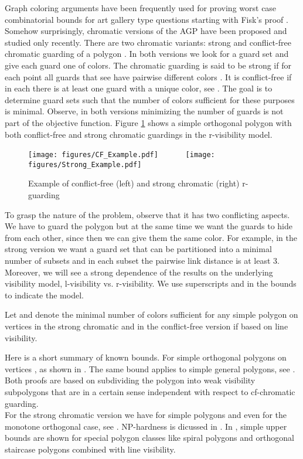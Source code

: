 \documentclass[a4paper,USenglish,numberwithinsect]{lipics}
\theoremstyle{plain}
\begin{document}
Graph  coloring arguments have been frequently
used  for proving worst case combinatorial bounds for art
gallery type questions starting with Fisk's proof \cite{Fisk}. Somehow
surprisingly, chromatic versions of the AGP have been
proposed and studied only recently. There are two chromatic variants: strong
 and conflict-free chromatic guarding  of a polygon . In  both
versions we look for a guard set  and give each guard one of 
colors. The chromatic guarding is said to be strong if for each point
 all guards  that see  have pairwise different colors
\cite{ELV}.  It is conflict-free if in  each   there is at least
one guard with a unique color, see \cite{BS}. The goal is to determine guard
sets such that the   number of colors sufficient  for these purposes is
minimal.  Observe, in both versions minimizing the number of guards is not
part of the objective function.  Figure \ref{cf_st_example} shows a simple orthogonal polygon with
both conflict-free and strong chromatic guardings in the r-visibility model.
\begin{figure}
\centering
\texttt{[image: figures/CF\_Example.pdf]}
\ \ \ \ \ \ \texttt{[image: figures/Strong\_Example.pdf]}

\caption{Example of conflict-free (left) and strong chromatic (right) r-guarding}
\label{cf_st_example}
\end{figure}
To grasp the nature of the problem, observe that it has two conflicting aspects. 
We have to guard the polygon but at the same time we want the guards to hide from each other, 
since then we can give them the same color. For example, in the strong version we want a guard set 
that can be partitioned into a minimal number of subsets and in each subset the pairwise link distance is at least 3.
Moreover, we will see a strong dependence of the results on the underlying visibility model, l-visibility vs. r-visibility. We use superscripts
 and  in the bounds to indicate the model.

Let  and   denote the minimal number of colors sufficient for any simple polygon on  vertices in the strong chromatic and in the conflict-free version if based on line visibility.

Here is a short summary of known bounds. For simple orthogonal polygons on  vertices
, as shown in  \cite{BS}. The same bound
applies to simple general polygons, see \cite{B_etal}.
Both proofs are based on subdividing the polygon into weak visibility
subpolygons that are in a certain sense independent with respect to
cf-chromatic guarding.
\\
For the strong chromatic version we have 
for simple polygons and  even for
the monotone orthogonal case,
 see \cite{ELV}. NP-hardness is dicussed in \cite{FFH}. In \cite{ELV}, simple  upper bounds are shown
for special polygon classes like spiral polygons and orthogonal
staircase polygons combined with line visibility. 
\end{document}
